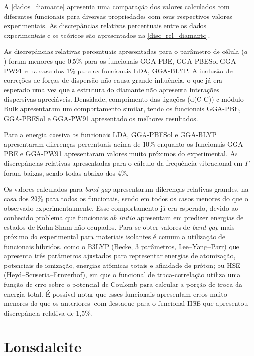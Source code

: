 		A \autoref{dados_diamante} apresenta uma comparação dos valores calculados com diferentes funcionais para diversas propriedades com seus respectivos valores experimentais. As discrepâncias relativas percentuais entre os dados experimentais e os teóricos são apresentados na \autoref{disc_rel_diamante}.
		
		As discrepâncias relativas percentuais apresentadas para o parâmetro de célula ($a$) foram menores que 0.5\% para os funcionais GGA-PBE, GGA-PBESol GGA-PW91 e na casa dos 1\% para os funcionais LDA, GGA-BLYP. A inclusão de correções de forças de dispersão não causa grande influência, o que já era esperado uma vez que a estrutura do diamante não apresenta interações dispersivas apreciáveis. Densidade, comprimento das ligações (d(C-C)) e módulo Bulk apresentaram um comportamento similar, tendo os funcionais GGA-PBE, GGA-PBESol e GGA-PW91 apresentado os melhores resultados. 
		
		Para a energia coesiva os funcionais LDA, GGA-PBESol e GGA-BLYP apresentaram diferenças percentuais acima de 10\% enquanto os funcionais GGA-PBE e GGA-PW91 apresentaram valores muito próximos do experimental. As discrepâncias relativas apresentadas para o cálculo da frequência vibracional em $\Gamma$ foram baixas, sendo todas abaixo dos 4\%. 
		
		Os valores calculados para \textit{band gap} apresentaram diferenças relativas grandes, na casa dos 20\% para todos os funcionais, sendo em todos os casos menores do que o observado experimentalmente. Esse comportamento já era esperado, devido ao conhecido problema que funcionais \textit{ab initio} apresentam em predizer energias de estados de Kohn-Sham não ocupados. Para se obter valores de \textit{band gap} mais próximo do experimental para materiais isolantes é comum a utilização de funcionais híbridos, como o B3LYP (Becke, 3 parâmetros, Lee–Yang–Parr) que apresenta três parâmetros ajustados para representar energias de atomização, potenciais de ionização, energias atômicas totais e afinidade de próton; ou HSE (Heyd–Scuseria–Ernzerhof), em que o funcional de troca-correlação utiliza uma função de erro sobre o potencial de Coulomb para calcular a porção de troca da energia total. \cite{heyd2003hybrid} É possível notar que esses funcionais apresentam erros muito menores do que os anteriores, com destaque para o funcional HSE que apresentou discrepância relativa de 1,5\%. 
 	     
 	\section{Lonsdaleite}
 	
